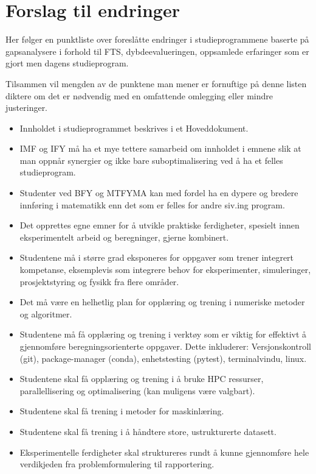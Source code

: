 \section{Forslag til endringer}

Her følger en punktliste over foreslåtte endringer i studieprogrammene baserte på gapsanalysere i forhold til FTS, dybdeevalueringen, oppsamlede erfaringer som er gjort men dagens studieprogram.

Tilsammen vil mengden av de punktene man mener er fornuftige på denne listen diktere om det er nødvendig med en omfattende omlegging eller mindre justeringer.

\begin{itemize}
	\item Innholdet i studieprogrammet beskrives i et Hoveddokument.
	\item IMF og IFY må ha et mye tettere samarbeid om innholdet i emnene slik at man oppnår synergier og ikke bare suboptimalisering ved å ha et felles studieprogram.
	\item Studenter ved BFY og MTFYMA kan med fordel ha en dypere og bredere innføring i matematikk enn det som er felles for andre siv.ing program.
	\item Det opprettes egne emner for å utvikle praktiske ferdigheter, spesielt innen eksperimentelt arbeid og beregninger, gjerne kombinert.
	\item Studentene må i større grad eksponeres for oppgaver som trener integrert kompetanse, eksemplevis som integrere behov for eksperimenter, simuleringer, prosjektstyring og fysikk fra flere områder.
	\item Det må være en helhetlig plan for opplæring og trening i numeriske metoder og algoritmer.
	\item Studentene må få opplæring og trening i verktøy som er viktig for effektivt å gjennomføre beregningsorienterte oppgaver. Dette inkluderer: Versjonskontroll (git), package-manager (conda), enhetstesting (pytest), terminalvindu, linux.
	\item Studentene skal få opplæring og trening i å bruke HPC ressurser, parallellisering og optimalisering (kan muligens være valgbart). 
	\item Studentene skal få trening i metoder for maskinlæring. 
	\item Studentene skal få trening i å håndtere store, ustrukturerte datasett.
	\item Eksperimentelle ferdigheter skal struktureres rundt å kunne gjennomføre hele verdikjeden fra problemformulering til rapportering.

\end{itemize}
